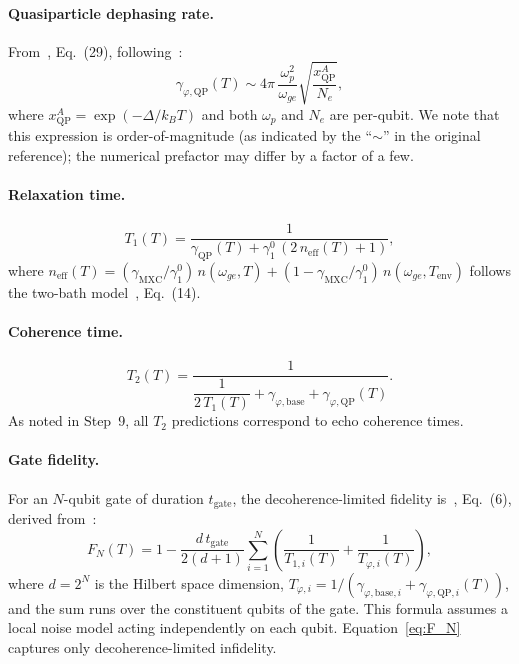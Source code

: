 \documentclass[showpacs,amsmath,amssymb,twocolumn,superscriptaddress,notitlepage,preprintnumbers,pra]{revtex4-1}
\begin{document}
\paragraph{Quasiparticle dephasing rate.}
From~\cite{lvov2025thermometry}, Eq.~(29), following~\cite{catelani2012qp_diffusion}:
\begin{equation}
	\label{eq:gamma_phi_qp}
	\gamma_{\varphi,\mathrm{QP}}(T) \sim 4\pi\,\frac{\omega_p^2}{\omega_{ge}} \sqrt{\frac{x_\mathrm{QP}^A}{N_e}},
\end{equation}
where $x_\mathrm{QP}^A = \exp(-\Delta/k_B T)$ and both $\omega_p$ and $N_e$ are per-qubit. We note that this expression is order-of-magnitude (as indicated by the ``$\sim$'' in the original reference); the numerical prefactor may differ by a factor of a few.

\paragraph{Relaxation time.}
\begin{equation}
	\label{eq:T1_T}
	T_1(T) = \frac{1}{\gamma_\mathrm{QP}(T) + \gamma_1^0\,(2\,n_\mathrm{eff}(T) + 1)},
\end{equation}
where $n_\mathrm{eff}(T) = (\gamma_\mathrm{MXC}/\gamma_1^0)\,n(\omega_{ge}, T) + (1 - \gamma_\mathrm{MXC}/\gamma_1^0)\,n(\omega_{ge}, T_\mathrm{env})$ follows the two-bath model~\cite{lvov2025thermometry}, Eq.~(14).

\paragraph{Coherence time.}
\begin{equation}
	\label{eq:T2_T}
	T_2(T) = \frac{1}{\dfrac{1}{2\,T_1(T)} + \gamma_{\varphi,\mathrm{base}} + \gamma_{\varphi,\mathrm{QP}}(T)}.
\end{equation}
As noted in Step~9, all $T_2$ predictions correspond to echo coherence times.

\paragraph{Gate fidelity.}
For an $N$-qubit gate of duration $t_\mathrm{gate}$, the decoherence-limited fidelity is~\cite{simbierowicz2024thermal_noise}, Eq.~(6), derived from~\cite{abad2022gate_fidelity}:
\begin{equation}
	\label{eq:F_N}
	F_N(T) = 1 - \frac{d\,t_\mathrm{gate}}{2(d+1)} \sum_{i=1}^{N} \left(\frac{1}{T_{1,i}(T)} + \frac{1}{T_{\varphi,i}(T)}\right),
\end{equation}
where $d = 2^N$ is the Hilbert space dimension, $T_{\varphi,i} = 1/(\gamma_{\varphi,\mathrm{base},i} + \gamma_{\varphi,\mathrm{QP},i}(T))$, and the sum runs over the constituent qubits of the gate. This formula assumes a local noise model acting independently on each qubit. Equation~\eqref{eq:F_N} captures only decoherence-limited infidelity.
\end{document}
